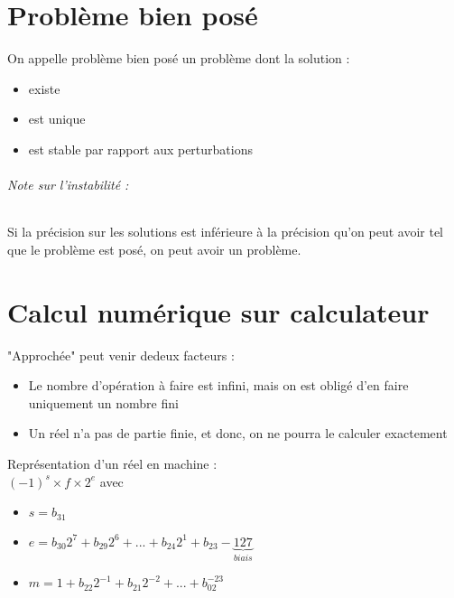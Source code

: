 \part{Problème bien posé}

On appelle problème bien posé un problème dont la solution : 
\begin{itemize}
\item existe
\item est unique
\item est stable par rapport aux perturbations
\end{itemize}

\paragraph*{Note sur l'instabilité : \\}
Si la précision sur les solutions est inférieure à la précision qu'on peut avoir tel que le problème est posé, on peut avoir un problème. 

\part{Calcul numérique sur calculateur}
"Approchée" peut venir dedeux facteurs :
\begin{itemize}
	\item Le nombre d'opération à faire est infini, mais on est obligé d'en faire uniquement un nombre fini
	\item Un réel n'a pas de partie finie, et donc, on ne pourra le calculer exactement
\end{itemize}

\bigskip
Représentation d'un réel en machine : \\
$(-1)^s\times f\times 2^e$ avec 
\begin{itemize}
	\item $s=b_{31}$
	\item $e=b_{30}2^7+b_{29}2^6+...+b_{24}2^1+b_{23}-\underbrace{127}_{biais}$
	\item $m=1+b_{22}2^{-1}+b_{21}2^{-2}+...+b_02^{-23}$
\end{itemize}
